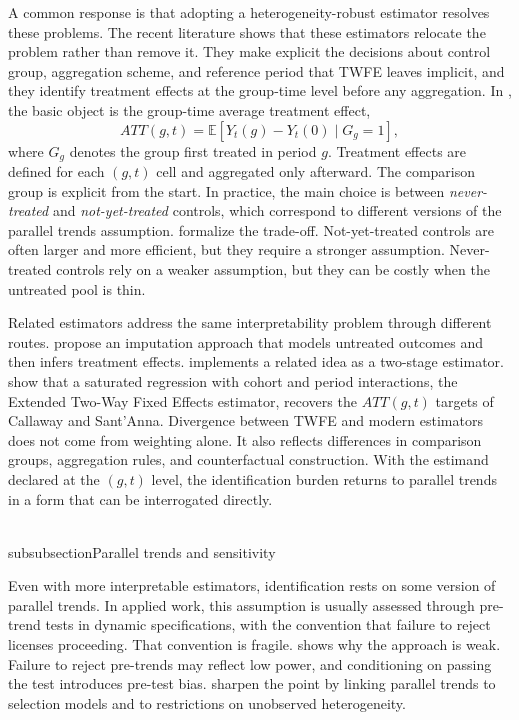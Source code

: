 \documentclass[11pt]{article}
\begin{document}
A common response is that adopting a heterogeneity-robust estimator resolves these problems. The recent literature shows that these estimators relocate the problem rather than remove it. They make explicit the decisions about control group, aggregation scheme, and reference period that TWFE leaves implicit, and they identify treatment effects at the group-time level before any aggregation. In \textcite{callaway2021difference}, the basic object is the group-time average treatment effect,
\begin{equation}
ATT(g,t)
=
\mathbb{E}\!\left[ Y_t(g)-Y_t(0)\mid G_g=1 \right],
\label{eq:att_gt_short}
\end{equation}
where \(G_g\) denotes the group first treated in period \(g\). Treatment effects are defined for each \((g,t)\) cell and aggregated only afterward. The comparison group is explicit from the start. In practice, the main choice is between \emph{never-treated} and \emph{not-yet-treated} controls, which correspond to different versions of the parallel trends assumption. \textcite{marcus2021role} formalize the trade-off. Not-yet-treated controls are often larger and more efficient, but they require a stronger assumption. Never-treated controls rely on a weaker assumption, but they can be costly when the untreated pool is thin.

Related estimators address the same interpretability problem through different routes. \textcite{borusyak2024revisiting} propose an imputation approach that models untreated outcomes and then infers treatment effects. \textcite{gardner2022two} implements a related idea as a two-stage estimator. \textcite{wooldridge2021two,wooldridge2025two} show that a saturated regression with cohort and period interactions, the Extended Two-Way Fixed Effects estimator, recovers the \(ATT(g,t)\) targets of Callaway and Sant'Anna. Divergence between TWFE and modern estimators does not come from weighting alone. It also reflects differences in comparison groups, aggregation rules, and counterfactual construction. With the estimand declared at the \((g,t)\) level, the identification burden returns to parallel trends in a form that can be interrogated directly.

\\subsubsection{Parallel trends and sensitivity}

Even with more interpretable estimators, identification rests on some version of parallel trends. In applied work, this assumption is usually assessed through pre-trend tests in dynamic specifications, with the convention that failure to reject licenses proceeding. That convention is fragile. \textcite{roth2022pretest} shows why the approach is weak. Failure to reject pre-trends may reflect low power, and conditioning on passing the test introduces pre-test bias. \textcite{ghanem2024selection} sharpen the point by linking parallel trends to selection models and to restrictions on unobserved heterogeneity.
\end{document}
